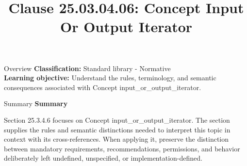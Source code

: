 \documentclass[10pt,letterpaper]{article}
\title{Clause 25.03.04.06: Concept Input Or Output Iterator}
\author{}
\date{}
\begin{document}
\maketitle
\begin{CornellOverviewBox}{Overview}
\textbf{Classification:} Standard library - Normative\\[2pt]
\textbf{Learning objective:} Understand the rules, terminology, and semantic consequences associated with Concept input\_or\_output\_iterator.
\end{CornellOverviewBox}\begin{CornellSummaryBox}{Summary}
{\sffamily\bfseries\color{Accent} Summary}\par\vspace{3pt}Section 25.3.4.6 focuses on Concept input\_or\_output\_iterator. The section supplies the rules and semantic distinctions needed to interpret this topic in context with its cross-references. When applying it, preserve the distinction between mandatory requirements, recommendations, permissions, and behavior deliberately left undefined, unspecified, or implementation-defined.
\end{CornellSummaryBox}
\end{document}

